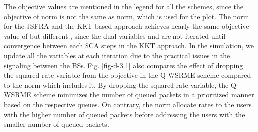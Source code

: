 The objective values are mentioned in the legend for all the schemes, since the objective of  norm is not the same as  norm, which is used for the plot. The  norm for the \ac{JSFRA} and the \ac{KKT} based approach achieves nearly the same objective value of  but different \me{\chi}, since the dual variables  and  are not iterated until convergence between each \ac{SCA} steps in the \ac{KKT} approach. In the simulation, we update all the variables at each iteration due to the practical issues in the signaling between the \acp{BS}. Fig. \ref{fig-d-3.1} also compares the effect of dropping the squared rate variable from the objective in the \ac{Q-WSRME} scheme compared to the  norm which includes it. By dropping the squared rate variable, the \ac{Q-WSRME} scheme minimizes the number of queued packets in a prioritized manner based on the respective queues. On contrary, the  norm allocate rates to the users with the higher number of queued packets before addressing the users with the smaller number of queued packets.


